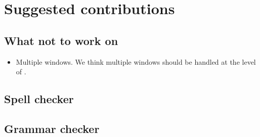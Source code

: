 \chapter{Suggested contributions}

\section{What not to work on}

\begin{itemize}
\item Multiple windows.  We think multiple windows should be handled
  at the level of \mcclim{}.
\end{itemize}

\section{Spell checker}

\section{Grammar checker}
